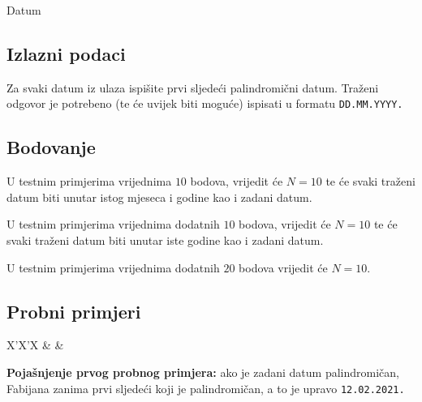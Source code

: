 \begin{statement}[
  problempoints=50,
  timelimit=1 sekunda,
  memorylimit=512 MiB,
]{Datum}
\subsection*{Izlazni podaci}
Za svaki datum iz ulaza ispišite prvi sljedeći palindromični datum. Traženi
odgovor je potrebeno (te će uvijek biti moguće) ispisati u formatu
\texttt{DD.MM.YYYY.}

\subsection*{Bodovanje}
U testnim primjerima vrijednima $10$ bodova, vrijedit će $N=10$ te će svaki traženi
datum biti unutar istog mjeseca i godine kao i zadani datum.

U testnim primjerima vrijednima dodatnih $10$ bodova, vrijedit će $N=10$ te će svaki
traženi datum biti unutar iste godine kao i zadani datum.

U testnim primjerima vrijednima dodatnih $20$ bodova vrijedit će $N=10$.

\subsection*{Probni primjeri}
\begin{tabularx}{\textwidth}{X'X'X}
 &
 &
\end{tabularx}

\textbf{Pojašnjenje prvog probnog primjera:}
ako je zadani datum palindromičan, Fabijana zanima prvi sljedeći koji je
palindromičan, a to je upravo \texttt{12.02.2021.}


\end{statement}

